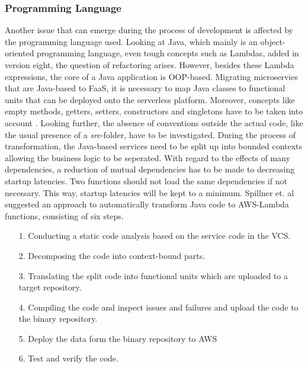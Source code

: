 \documentclass[a4paper,twoside,11pt, pagesize]{scrartcl}
\begin{document}
\subsubsection{Programming Language}
 Another issue that can emerge during the process of development is affected by the programming language used. Looking at Java, which mainly is an object-oriented programming language, even tough concepts such as Lambdas, added in version eight, the question of refactoring arises. However, besides these Lambda expressions, the core of a Java application is OOP-based. Migrating microservies that are Java-based to FaaS, it is necessary to map Java classes to functional units that can be deployed onto the serverless platform. Moreover, concepts like empty methods, getters, setters, constructors and singletons have to be taken into account \cite{spillner2017Java}. Looking further, the absence of conventions outside the actual code, like the usual presence of a \textit{src}-folder, have to be investigated. During the process of transformation, the Java-based services need to be split up into bounded contexts allowing the business logic to be seperated. With regard to the effects of many dependencies, a reduction of mutual dependencies has to be made to decreasing startup latencies. Two functions should not load the same dependencies if not necessary. This way, startup latencies will be kept to a minimum. Spillner et. al suggested an approach to automatically transform Java code to AWS-Lambda functions, consisting of six steps.
\begin{itemize}
  \item[1.] Conducting a static code analysis based on the service code in the VCS.
  \item[2.] Decomposing the code into context-bound parts.
  \item[3.] Translating the split code into functional units which are uploaded to a target repository. 
  \item[4.] Compiling the code and inspect issues and failures and upload the code to the binary repository. 
  \item[5.] Deploy the data form the binary repository to AWS
  \item[6.] Test and verify the code.
\end{itemize}
\end{document}
